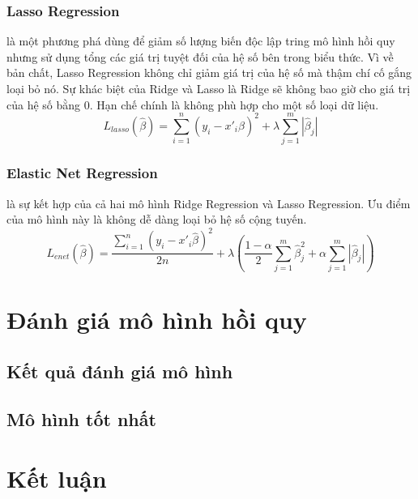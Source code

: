 \documentclass[runningheads]{llncs}
\begin{document}
\subsubsection{Lasso Regression}
là một phương phá dùng để giảm số lượng biến độc lập tring mô hình hồi quy nhưng sử dụng tổng các giá trị tuyệt đối của hệ số bên trong biểu thức. Vì về bản chất, Lasso Regression không chỉ giảm giá trị của hệ số mà thậm chí cố gắng loại bỏ nó. Sự khác biệt của Ridge và Lasso là Ridge sẽ không bao giờ cho giá trị của hệ số bằng 0. Hạn chế chính là không phù hợp cho một số loại dữ liệu.
	\begin{equation}
	L_{lasso}(\hat{\beta})=\sum^{n}_{i=1}{(y_i-x'_i\hat{\beta})^2}+\lambda\sum^{m}_{j=1}{|\hat{\beta}_j|}
	\end{equation}

\subsubsection{Elastic Net Regression}
là sự kết hợp của cả hai mô hình Ridge Regression và Lasso Regression. Ưu điểm của mô hình này là không dễ dàng loại bỏ hệ số cộng tuyến.
	\begin{equation}
		L_{enet}(\hat{\beta})=\frac{\sum^{n}_{i=1}{(y_i-x'_i\hat{\beta})^2}}{2n}+\lambda(\frac{1-\alpha}{2}\sum^{m}_{j=1}{\hat{\beta}^2_j+\alpha\sum^{m}_{j=1}{|\hat{\beta}_j|}})
	\end{equation}
\section{Đánh giá mô hình hồi quy}

\subsection{Kết quả đánh giá mô hình}

\subsection{Mô hình tốt nhất}

\section{Kết luận}

\begin{thebibliography}{5}

\end{thebibliography}
\pagebreak
\end{document}
